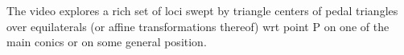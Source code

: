 The video explores a rich set of loci swept by triangle centers of pedal triangles over equilaterals (or affine transformations thereof) wrt point P on one of the main conics or on some general position.
